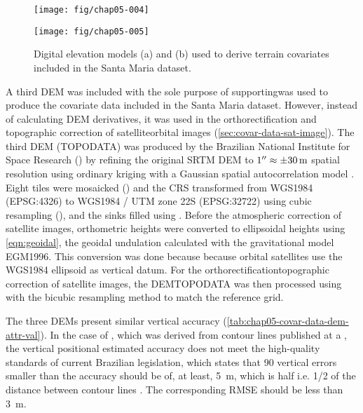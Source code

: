 \begin{figure}[!ht]
\centering
\begin{minipage}[b]{63mm}
\subcaption{}
\centering
\texttt{[image: fig/chap05-004]}
\end{minipage}
\begin{minipage}[b]{63mm}
\subcaption{}
\centering
\texttt{[image: fig/chap05-005]}
\end{minipage} 
\caption{Digital elevation models (a) \demOld{} and (b) \demNew{} used to derive terrain covariates included 
in the Santa Maria dataset.}
\label{fig:covar-data-dem}
\end{figure}

A third DEM was included with the sole purpose of supportingwas used to produce the covariate data included in 
the Santa Maria dataset. However, instead of 
calculating DEM derivatives, it was used in the orthorectification and topographic correction of 
satelliteorbital 
images (\autoref{sec:covar-data-sat-image}). The third DEM (TOPODATA\topodata) was produced by the Brazilian 
National 
Institute for Space Research (\inpe) by refining the original SRTM DEM to $\SI{1}{\arcsecond} \approx 
\SI{\pm30}{\m}$ spatial resolution using ordinary kriging with a Gaussian spatial autocorrelation model 
\cite{ValerianoEtAl2012}. Eight tiles were mosaicked () and the CRS transformed from 
WGS1984 (EPSG:4326) to WGS1984 / UTM zone 22S (EPSG:32722) using cubic resampling (), and the
sinks filled using . Before the atmospheric correction of satellite images, orthometric 
heights were converted to ellipsoidal heights using \autoref{eqn:geoidal}, the geoidal undulation calculated 
with the gravitational model EGM1996. This conversion was done because because orbital satellites use the 
WGS1984 ellipsoid as vertical datum. For the orthorectificationtopographic correction of satellite images, the 
DEMTOPODATA was then 
processed using  with the bicubic resampling method to match the reference grid.

The three DEMs present similar vertical accuracy (\autoref{tab:chap05-covar-data-dem-attr-val}). In the case 
of 
\demNew{}, which was derived from contour lines published at a , the vertical positional estimated 
accuracy does not 
meet the high-quality standards of current Brazilian legislation, which states that 90%
vertical errors smaller than the accuracy should be of, at least, \SI{5}{\metre}, which is half i.e.
\num{1/2} of the distance between contour lines \cite{Brasil1984}. The corresponding RMSE should be less than 
\SI{3}{\metre}.


